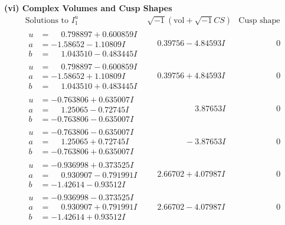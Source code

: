 \documentclass[1p]{elsarticle_modified}
\theoremstyle{definition}
\newcommand{\I}{\sqrt{-1}}
\begin{document}
\newpage\flushleft \textbf{(vi) Complex Volumes and Cusp Shapes}
$$\begin{array}{c|c|c}  
\text{Solutions to }I^u_{1}& \I (\text{vol} + \sqrt{-1}CS) & \text{Cusp shape}\\
 \hline 
\begin{aligned}
u &= \phantom{-}0.798897 + 0.600859 I \\
a &= -1.58652 - 1.10809 I \\
b &= \phantom{-}1.043510 - 0.483445 I\end{aligned}
 & \phantom{-}0.39756 - 4.84593 I & \phantom{-0.000000 } 0 \\ \hline\begin{aligned}
u &= \phantom{-}0.798897 - 0.600859 I \\
a &= -1.58652 + 1.10809 I \\
b &= \phantom{-}1.043510 + 0.483445 I\end{aligned}
 & \phantom{-}0.39756 + 4.84593 I & \phantom{-0.000000 } 0 \\ \hline\begin{aligned}
u &= -0.763806 + 0.635007 I \\
a &= \phantom{-}1.25065 - 0.72745 I \\
b &= -0.763806 - 0.635007 I\end{aligned}
 & \phantom{-0.000000 -}3.87653 I & \phantom{-0.000000 } 0 \\ \hline\begin{aligned}
u &= -0.763806 - 0.635007 I \\
a &= \phantom{-}1.25065 + 0.72745 I \\
b &= -0.763806 + 0.635007 I\end{aligned}
 & \phantom{-0.000000 } -3.87653 I & \phantom{-0.000000 } 0 \\ \hline\begin{aligned}
u &= -0.936998 + 0.373525 I \\
a &= \phantom{-}0.930907 - 0.791991 I \\
b &= -1.42614 - 0.93512 I\end{aligned}
 & \phantom{-}2.66702 + 4.07987 I & \phantom{-0.000000 } 0 \\ \hline\begin{aligned}
u &= -0.936998 - 0.373525 I \\
a &= \phantom{-}0.930907 + 0.791991 I \\
b &= -1.42614 + 0.93512 I\end{aligned}
 & \phantom{-}2.66702 - 4.07987 I & \phantom{-0.000000 } 0 \\ \hline\begin{aligned}

\end{aligned}
\end{array}$$
\end{document}
